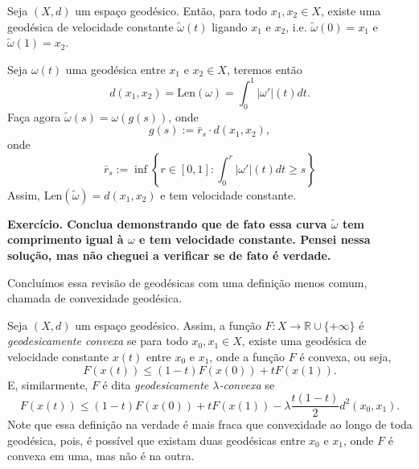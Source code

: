 \begin{proposition}
    Seja $(X,d)$ um espaço geodésico. Então, para todo $x_1,x_2 \in X$,
    existe uma geodésica de velocidade constante $\tilde \omega(t)$ ligando
    $x_1$ e $x_2$, i.e. $\tilde \omega(0) = x_1$ e $\tilde \omega(1) = x_2$.
\end{proposition}
\begin{prf}
    Seja $\omega(t)$ uma geodésica entre $x_1$ e $x_2 \in X$, teremos então
    \begin{equation*}
        d(x_1,x_2) = \text{Len}(\omega) = \int_0^1 |\omega'|(t)dt.
    \end{equation*}
    Faça agora $\tilde \omega (s) = \omega(g(s))$, onde
    \begin{equation*}
        g(s):= \bar r_s \cdot d(x_1,x_2),
    \end{equation*}
    onde
    \begin{equation*}
        \bar r_s := \inf \left\{
            r \in [0,1]: \int^r_0 |\omega'|(t) dt\geq s
            \right\}
    \end{equation*}
    Assim, $\text{Len}(\tilde \omega) = d(x_1,x_2)$ e tem velocidade constante.

    \textbf{Exercício. Conclua demonstrando que de fato essa curva $\tilde \omega$ tem comprimento
    igual à $\omega$ e tem velocidade constante. Pensei nessa solução, mas não cheguei a verificar
    se de fato é verdade.}
\end{prf}

Concluímos essa revisão de geodésicas com uma definição menos comum, chamada de convexidade geodésica.

\begin{definition}
    Seja $(X,d)$ um espaço geodésico. Assim, a função $F:X \to \mathbb R \cup \{+\infty\}$
    é \textit{geodesicamente convexa} se para todo $x_0,x_1 \in X$, existe uma geodésica
    de velocidade constante $x(t)$
    entre $x_0$ e $x_1$, onde a função $F$ é convexa, ou seja,
    \begin{equation}
        F(x(t)) \leq (1-t)F(x(0)) + tF(x(1)).
    \end{equation}
    E, similarmente, $F$ é dita \textit{geodesicamente $\lambda$-convexa} se
    \begin{equation}
        F(x(t)) \leq (1-t)F(x(0)) + tF(x(1))-\lambda\frac{t(1-t)}{2}d^2(x_0,x_1).
    \end{equation}
    Note que essa definição na verdade é mais fraca que convexidade ao longo de toda geodésica,
    pois, é possível que existam duas geodésicas entre $x_0$ e $x_1$, onde $F$ é convexa
    em uma, mas não é na outra.
\end{definition}



